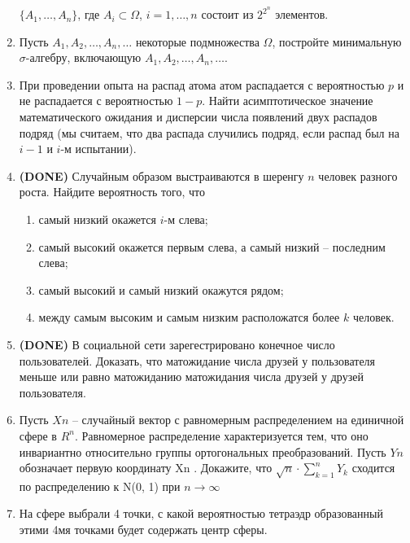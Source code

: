 \documentclass[a4paper, 14pt]{extarticle}
\begin{document}
\begin{enumerate}
	$\{A_1,\ldots, A_n\}$, где $A_i\subset\Omega$, $i = 1,\ldots, n$ состоит из $2^{2^n}$ элементов.
	\item Пусть $A_1,A_2,\ldots, A_n,\ldots$ некоторые подмножества $\Omega$, постройте минимальную $\sigma$-алгебру, включающую $A_1,A_2,\ldots, A_n,\ldots$.
	\item При проведении опыта на распад атома атом распадается с вероятностью $p$ и не распадается с вероятностью $1-p$. Найти асимптотическое значение математического ожидания и дисперсии числа появлений двух распадов подряд (мы считаем, что два распада случились подряд, если распад был на $i-1$ и $i$-м испытании).
	
\item \textbf{(DONE)} Случайным образом выстраиваются в шеренгу $n$ человек разного
роста. Найдите вероятность того, что
\begin{enumerate}
	\item самый низкий окажется $i$-м слева;
	\item самый высокий окажется первым слева, а самый низкий -- последним слева;
	\item самый высокий и самый низкий окажутся рядом;
	\item между самым высоким и самым низким расположатся более $k$
человек.
\end{enumerate}

\item \textbf{(DONE)} В социальной сети зарегестрировано конечное число пользователей. 
Доказать, что матожидание числа друзей у пользователя меньше или равно матожиданию матожидания числа друзей у друзей пользователя. 

\item Пусть $Xn$ – случайный вектор с равномерным распределением на единичной сфере в $R^n$.
Равномерное распределение характеризуется тем, что оно инвариантно относительно группы ортогональных преобразований. 
Пусть $Yn$ обозначает первую координату Xn . Докажите, что $\sqrt{n} \cdot \sum_{k=1}^{n} Y_k$ сходится по распределению к N(0, 1) при $n \to \infty$

\item На сфере выбрали 4 точки, с какой вероятностью тетраэдр образованный этими 4мя точками будет содержать центр сферы.

\end{enumerate}
\end{document}
